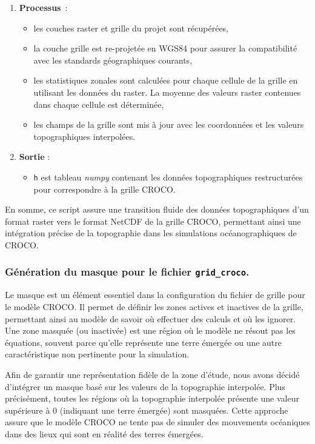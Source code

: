 {\begin{enumerate}
	\item \textbf{Processus}~:
	\begin{itemize}
		\item les couches raster et grille du projet sont récupérées,
		\item la couche grille est re-projetée en WGS84 pour assurer la compatibilité avec les standards géographiques courants,
		\item les statistiques zonales sont calculées pour chaque cellule de la grille en utilisant les données du raster. La moyenne des valeurs raster contenues dans chaque cellule est déterminée,
		\item les champs de la grille sont mis à jour avec les coordonnées et les valeurs topographiques interpolées.
	\end{itemize}

	\item \textbf{Sortie} :
	\begin{itemize}
		\item \texttt{h} est tableau \textit{numpy} contenant les données topographiques restructurées pour correspondre à la grille CROCO.
	\end{itemize}
\end{enumerate}

En somme, ce script assure une transition fluide des données topographiques d'un format raster vers le format NetCDF de la grille CROCO, permettant ainsi une intégration précise de la topographie dans les simulations océanographiques de CROCO.

\subsubsection{Génération du masque pour le fichier \texttt{grid\_croco}.}

Le masque est un élément essentiel dans la configuration du fichier de grille pour le modèle CROCO. Il permet de définir les zones actives et inactives de la grille, permettant ainsi au modèle de savoir où effectuer des calculs et où les ignorer. Une zone masquée (ou inactivée) est une région où le modèle ne résout pas les équations, souvent parce qu'elle représente une terre émergée ou une autre caractéristique non pertinente pour la simulation.

Afin de garantir une représentation fidèle de la zone d'étude, nous avons décidé d'intégrer un masque basé sur les valeurs de la topographie interpolée. Plus précisément, toutes les régions où la topographie interpolée présente une valeur supérieure à 0 (indiquant une terre émergée) sont masquées. Cette approche assure que le modèle CROCO ne tente pas de simuler des mouvements océaniques dans des lieux qui sont en réalité des terres émergées.

}
